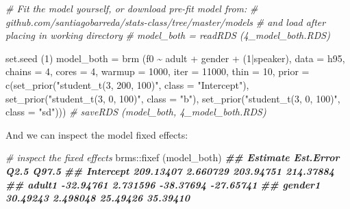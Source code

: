 \documentclass[
]{book}
\newenvironment{Shaded}{\begin{snugshade}}{\end{snugshade}}
\newcommand{\AttributeTok}[1]{\textcolor[rgb]{0.77,0.63,0.00}{#1}}
\newcommand{\CommentTok}[1]{\textcolor[rgb]{0.56,0.35,0.01}{\textit{#1}}}
\newcommand{\DecValTok}[1]{\textcolor[rgb]{0.00,0.00,0.81}{#1}}
\newcommand{\DocumentationTok}[1]{\textcolor[rgb]{0.56,0.35,0.01}{\textbf{\textit{#1}}}}
\newcommand{\FunctionTok}[1]{\textcolor[rgb]{0.00,0.00,0.00}{#1}}
\newcommand{\NormalTok}[1]{#1}
\newcommand{\OtherTok}[1]{\textcolor[rgb]{0.56,0.35,0.01}{#1}}
\newcommand{\SpecialCharTok}[1]{\textcolor[rgb]{0.00,0.00,0.00}{#1}}
\newcommand{\StringTok}[1]{\textcolor[rgb]{0.31,0.60,0.02}{#1}}
\begin{document}
\begin{Shaded}
\begin{Highlighting}[]
\CommentTok{\# Fit the model yourself, or download pre{-}fit model from: }
\CommentTok{\# github.com/santiagobarreda/stats{-}class/tree/master/models}
\CommentTok{\# and load after placing in working directory}
\CommentTok{\#  model\_both = readRDS (\textquotesingle{}4\_model\_both.RDS\textquotesingle{})}

\FunctionTok{set.seed}\NormalTok{ (}\DecValTok{1}\NormalTok{)}
\NormalTok{model\_both }\OtherTok{=}  
  \FunctionTok{brm}\NormalTok{ (f0 }\SpecialCharTok{\textasciitilde{}}\NormalTok{ adult }\SpecialCharTok{+}\NormalTok{ gender }\SpecialCharTok{+}\NormalTok{ (}\DecValTok{1}\SpecialCharTok{|}\NormalTok{speaker), }\AttributeTok{data =}\NormalTok{ h95, }\AttributeTok{chains =} \DecValTok{4}\NormalTok{, }\AttributeTok{cores =} \DecValTok{4}\NormalTok{, }
       \AttributeTok{warmup =} \DecValTok{1000}\NormalTok{, }\AttributeTok{iter =} \DecValTok{11000}\NormalTok{, }\AttributeTok{thin =} \DecValTok{10}\NormalTok{, }
       \AttributeTok{prior =} \FunctionTok{c}\NormalTok{(}\FunctionTok{set\_prior}\NormalTok{(}\StringTok{"student\_t(3, 200, 100)"}\NormalTok{, }\AttributeTok{class =} \StringTok{"Intercept"}\NormalTok{),}
                              \FunctionTok{set\_prior}\NormalTok{(}\StringTok{"student\_t(3, 0, 100)"}\NormalTok{, }\AttributeTok{class =} \StringTok{"b"}\NormalTok{),}
                              \FunctionTok{set\_prior}\NormalTok{(}\StringTok{"student\_t(3, 0, 100)"}\NormalTok{, }\AttributeTok{class =} \StringTok{"sd"}\NormalTok{))) }
\CommentTok{\#  saveRDS (model\_both, \textquotesingle{}4\_model\_both.RDS\textquotesingle{})}
\end{Highlighting}
\end{Shaded}

And we can inspect the model fixed effects:

\begin{Shaded}
\begin{Highlighting}[]
\CommentTok{\# inspect the fixed effects}
\NormalTok{brms}\SpecialCharTok{::}\FunctionTok{fixef}\NormalTok{ (model\_both)}
\DocumentationTok{\#\#            Estimate Est.Error      Q2.5     Q97.5}
\DocumentationTok{\#\# Intercept 209.13407  2.660729 203.94751 214.37884}
\DocumentationTok{\#\# adult1    {-}32.94761  2.731596 {-}38.37694 {-}27.65741}
\DocumentationTok{\#\# gender1    30.49243  2.498048  25.49426  35.39410}
\end{Highlighting}
\end{Shaded}
\end{document}
